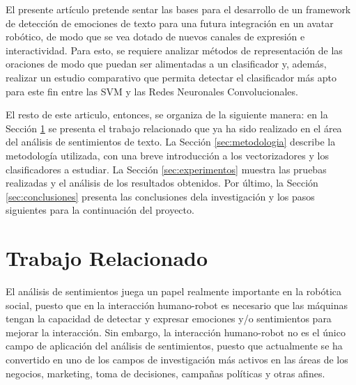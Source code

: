 \documentclass[conference]{IEEEtran}
\begin{document}
    El presente artículo pretende sentar las bases para el desarrollo de un framework de detección de emociones de texto para una futura integración en un avatar robótico, de modo que se vea dotado de nuevos canales de expresión e interactividad. Para esto, se requiere analizar métodos de representación de las oraciones de modo que puedan ser alimentadas a un clasificador y, además, realizar un estudio comparativo que permita detectar el clasificador más apto para este fin entre las SVM y las Redes Neuronales Convolucionales.
    
    El resto de este articulo, entonces, se organiza de la siguiente manera: en la Sección \ref{sec:antecedentes} se presenta el trabajo relacionado que ya ha sido realizado en el área del análisis de sentimientos de texto. La Sección \ref{sec:metodologia} describe la metodología utilizada, con una breve introducción a los vectorizadores y los clasificadores a estudiar. La Sección \ref{sec:experimentos} muestra las pruebas realizadas y el análisis de los resultados obtenidos. Por último, la Sección \ref{sec:conclusiones} presenta las conclusiones dela investigación y los pasos siguientes para la continuación del proyecto.




\section{Trabajo Relacionado} \label{sec:antecedentes}

    El análisis de sentimientos juega un papel realmente importante en la robótica social, puesto que en la interacción humano-robot es necesario que las máquinas tengan la capacidad de detectar y expresar emociones y/o sentimientos para mejorar la interacción. Sin embargo, la interacción humano-robot no es el único campo de aplicación del análisis de sentimientos, puesto que actualmente se ha convertido en uno de los campos de investigación más activos en las áreas de los negocios, marketing, toma de decisiones, campañas políticas y otras afines\cite{alzahrani2018development}.
    
\end{document}
